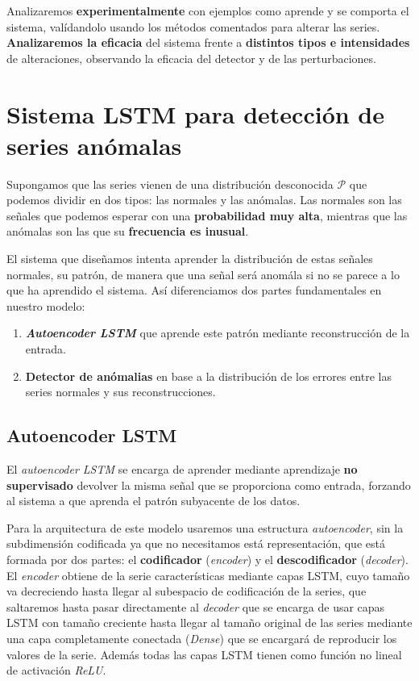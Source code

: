 Analizaremos \textbf{experimentalmente} con ejemplos como aprende y se comporta el sistema, valídandolo usando los métodos comentados para alterar las series. \textbf{Analizaremos la eficacia} del sistema frente a \textbf{distintos tipos e intensidades} de alteraciones, observando la eficacia del detector y de las perturbaciones.

\chapter{Sistema LSTM para detección de series anómalas}\label{ch:ad-detector}

Supongamos que las series vienen de una distribución desconocida $\mathcal{P}$ que podemos dividir en dos tipos: las normales y las anómalas. Las normales son las señales que podemos esperar con una \textbf{probabilidad muy alta}, mientras que las anómalas son las que su \textbf{frecuencia es inusual}.

El sistema que diseñamos intenta aprender la distribución de estas señales normales, su patrón, de manera que una señal será anomála si no se parece a lo que ha aprendido el sistema. Así diferenciamos dos partes fundamentales en nuestro modelo:

\begin{enumerate}
  \item \textbf{\emph{Autoencoder LSTM}} que aprende este patrón mediante reconstrucción de la entrada.
  \item \textbf{Detector de anómalias} en base a la distribución de los errores entre las series normales y sus reconstrucciones.
\end{enumerate}

\section{Autoencoder LSTM}

El \emph{autoencoder LSTM} se encarga de aprender mediante aprendizaje \textbf{no supervisado} devolver la misma señal que se proporciona como entrada, forzando al sistema a que aprenda el patrón subyacente de los datos.

Para la arquitectura de este modelo usaremos una estructura \emph{autoencoder}, sin la subdimensión codificada ya que no necesitamos está representación, que está formada por dos partes: el \textbf{codificador} (\emph{encoder}) y el \textbf{descodificador} (\emph{decoder}). El \emph{encoder} obtiene de la serie características mediante capas LSTM, cuyo tamaño va decreciendo hasta llegar al subespacio de codificación de la series, que saltaremos hasta pasar directamente al \emph{decoder} que se encarga de usar capas LSTM con tamaño creciente hasta llegar al tamaño original de las series mediante una capa completamente conectada (\emph{Dense}) que se encargará de reproducir los valores de la serie. Además todas las capas LSTM tienen como función no lineal de activación \emph{ReLU}.


